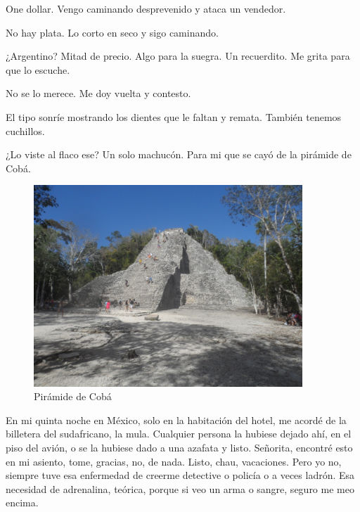 \documentclass[12pt,twoside,openright,a5paper]{book}
\begin{document}
One dollar. Vengo caminando desprevenido y ataca un vendedor.

No hay plata. Lo corto en seco y sigo caminando.

¿Argentino? Mitad de precio. Algo para la suegra. Un recuerdito. Me grita
para que lo escuche.

No se lo merece. Me doy vuelta y contesto.

El tipo sonríe mostrando los dientes que le faltan y remata. También
tenemos cuchillos.


\vspace{0.5cm}
\hrulefill\hspace{0.2cm} \decofourleft\decofourright \hspace{0.2cm} \hrulefill
\vspace{0.5cm}

¿Lo viste al flaco ese? Un solo machucón. Para mi que se cayó de la
pirámide de Cobá.

\begin{figure}[H]
  \centering
    \includegraphics[width=0.9\textwidth]{fotos/2012/coba}
  \caption{Pirámide de Cobá}
  \label{Pirámide de Cobá}
\end{figure}


\vspace{0.5cm}
\hrulefill\hspace{0.2cm} \decofourleft\decofourright \hspace{0.2cm} \hrulefill
\vspace{0.5cm}

En mi quinta noche en México, solo en la habitación del hotel, me acordé
de la billetera del sudafricano, la mula. Cualquier persona la hubiese
dejado ahí, en el piso del avión, o se la hubiese dado a una azafata
y listo. Señorita, encontré esto en mi asiento, tome, gracias, no, de
nada. Listo, chau, vacaciones. Pero yo no, siempre tuve esa enfermedad de
creerme detective o policía o a veces ladrón. Esa necesidad de adrenalina,
teórica, porque si veo un arma o sangre, seguro me meo encima.
\end{document}
